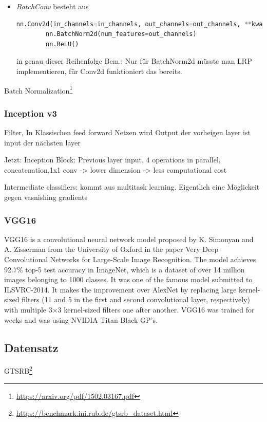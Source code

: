 \documentclass[11pt,a4paper]{article}
\numberwithin{equation}{section}
\begin{document}
	\begin{itemize}
		\item \textit{BatchConv} besteht aus 
		\begin{lstlisting}[language=Python, caption=python-interner Aufbau einer BatchConv Schicht
		]
		nn.Conv2d(in_channels=in_channels, out_channels=out_channels, **kwargs)
		nn.BatchNorm2d(num_features=out_channels)
		nn.ReLU()
		\end{lstlisting}
		in genau dieser Reihenfolge
		Bem.: Nur für BatchNorm2d müsste man LRP implementieren, für Conv2d funktioniert das bereits.
	\end{itemize}
	
	Batch Normalization\footnote{\url{https://arxiv.org/pdf/1502.03167.pdf}}
	
	
	\subsubsection{Inception v3}
	Filter,
	In Klassischen feed forward Netzen wird Output der vorheigen layer ist input der nächsten layer
	
	Jetzt: Inception Block: Previous layer input, 4 operations in parallel, concatenation,1x1 conv -> lower dimension -> less computational cost
	
	Intermediate classifiers: kommt aus multitask learning. Eigentlich eine Möglickeit gegen vasnishing gradients
	
	\subsubsection{VGG16}
	VGG16 is a convolutional neural network model proposed by K. Simonyan and A. Zisserman from the University of Oxford in the paper Very Deep Convolutional Networks for Large-Scale Image Recognition. The model achieves 92.7\% top-5 test accuracy in ImageNet, which is a dataset of over 14 million images belonging to 1000 classes. It was one of the famous model submitted to ILSVRC-2014. It makes the improvement over AlexNet by replacing large kernel-sized filters (11 and 5 in the first and second convolutional layer, respectively) with multiple 3×3 kernel-sized filters one after another. VGG16 was trained for weeks and was using NVIDIA Titan Black GP’s.%
	
	\subsection{Datensatz}
	GTSRB\footnote{\url{https://benchmark.ini.rub.de/gtsrb_dataset.html}}
	
\end{document}
